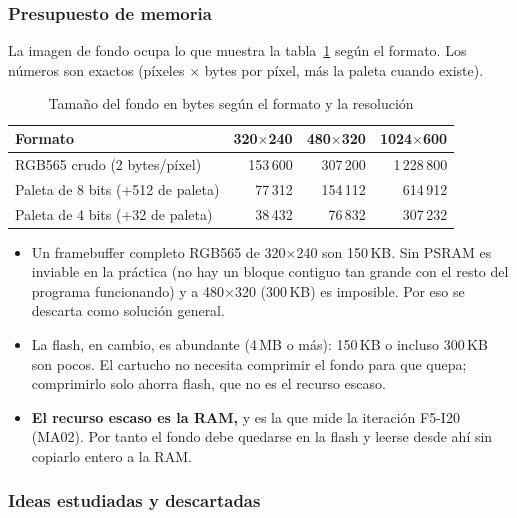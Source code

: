 \subsubsection{Presupuesto de memoria}

La imagen de fondo ocupa lo que muestra la tabla~\ref{tab:F6I01Tamanos} según el formato. Los números son exactos (píxeles $\times$ bytes por píxel, más la paleta cuando existe).

\begin{table}[H]
	\centering
	\begin{tabular}{lrrr}
		\toprule
		Formato & 320$\times$240 & 480$\times$320 & 1024$\times$600 \\
		\midrule
		RGB565 crudo (2 bytes/píxel) & 153\,600 & 307\,200 & 1\,228\,800 \\
		Paleta de 8 bits (+512 de paleta) & 77\,312 & 154\,112 & 614\,912 \\
		Paleta de 4 bits (+32 de paleta) & 38\,432 & 76\,832 & 307\,232 \\
		\bottomrule
	\end{tabular}
	\caption{Tamaño del fondo en bytes según el formato y la resolución}
	\label{tab:F6I01Tamanos}
\end{table}

\begin{itemize}
	\item Un framebuffer completo RGB565 de 320$\times$240 son 150\,KB. Sin PSRAM es inviable en la práctica (no hay un bloque contiguo tan grande con el resto del programa funcionando) y a 480$\times$320 (300\,KB) es imposible. Por eso se descarta como solución general.
	\item La flash, en cambio, es abundante (4\,MB o más): 150\,KB o incluso 300\,KB son pocos. El cartucho no necesita comprimir el fondo para que quepa; comprimirlo solo ahorra flash, que no es el recurso escaso.
	\item \textbf{El recurso escaso es la RAM,} y es la que mide la iteración F5-I20 (MA02). Por tanto el fondo debe quedarse en la flash y leerse desde ahí sin copiarlo entero a la RAM.
\end{itemize}

\subsubsection{Ideas estudiadas y descartadas}

